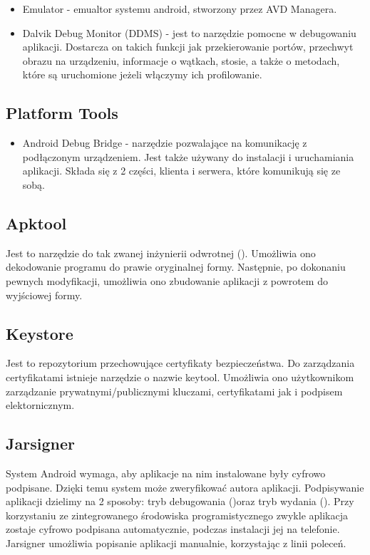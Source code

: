 \begin{itemize}
\item Emulator - emualtor systemu android, stworzony przez AVD Managera.
\item Dalvik Debug Monitor (DDMS) \label{ddms}- jest to narzędzie pomocne w debugowaniu aplikacji. Dostarcza on takich funkcji jak przekierowanie portów, przechwyt obrazu na urządzeniu, informacje o wątkach, stosie, a także o metodach, które są uruchomione jeżeli włączymy ich profilowanie.
\end{itemize}

\subsection{Platform Tools}

\begin{itemize}
\item Android Debug Bridge \label{adb}- narzędzie pozwalające na komunikację z podłączonym urządzeniem. Jest także używany do instalacji i uruchamiania aplikacji. Składa się z 2 części, klienta i serwera, które komunikują się ze sobą.
\end{itemize}

\subsection{Apktool}

Jest to narzędzie do tak zwanej inżynierii odwrotnej (). Umożliwia ono dekodowanie programu do prawie oryginalnej formy. Następnie, po dokonaniu pewnych modyfikacji, umożliwia ono zbudowanie aplikacji z powrotem do wyjściowej formy.\cite{doc:apktool}

\subsection{Keystore}

Jest to repozytorium przechowujące certyfikaty bezpieczeństwa. Do zarządzania certyfikatami istnieje narzędzie o nazwie keytool. Umożliwia ono użytkownikom zarządzanie prywatnymi/publicznymi kluczami, certyfikatami jak i podpisem elektornicznym.\cite{doc:keytool}

\subsection{Jarsigner}

System Android wymaga, aby aplikacje na nim instalowane były cyfrowo podpisane. Dzięki temu system może zweryfikować autora aplikacji. Podpisywanie aplikacji dzielimy na 2 sposoby: tryb debugowania ()oraz tryb wydania (). Przy korzystaniu ze zintegrowanego środowiska programistycznego zwykle aplikacja zostaje cyfrowo podpisana automatycznie, podczas instalacji jej na telefonie. Jarsigner umożliwia popisanie aplikacji manualnie, korzystając z linii poleceń.

